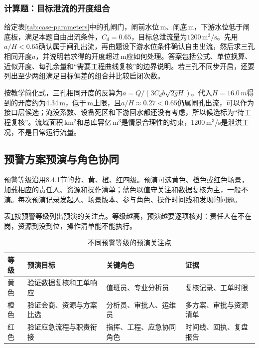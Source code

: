 \subsubsection{计算题：目标泄流的开度组合}
给定表\ref{tab:case-parameters}中的\cpGateCount 孔闸门，闸前水位\cpNormalLevel\,m、闸底\cpGateSillElev\,m，下游水位低于闸底板，满足本题自由出流条件，$C_d=0.65$，目标总泄流量为$1200\,\mathrm{m^3/s}$。先用$a/H<0.65$确认属于闸孔出流，再由题设下游水位条件确认自由出流，然后求三孔相同开度$a$，并说明若求得的开度超过\cpGateMaxOpen\,m应如何处理。答案包括公式、单位换算、近似开度、每孔余量和“需要工程曲线复核”的边界说明。若三孔不同步开启，还要列出至少两组满足目标偏差的组合并比较启闭次数。

按教学简化式，三孔相同开度的反算为$a=Q/(3C_db\sqrt{2gH})$。代入$H=16.0\,m$得到的开度约为4.34\,m，低于\cpGateMaxOpen\,m上限，且$a/H\approx0.27<0.65$仍属闸孔出流，可以作为接口层候选；淹没系数、设备死区和下游回水都还没有考虑，所以候选标为“待工程复核”。流域面积\cpBasinArea\,km$^2$和总库容\cpTotalCapacity 亿\,m$^3$是情景合理性的约束，1200\,m$^3$/s是泄洪工况，不是日常运行流量。

\subsection{预警方案预演与角色协同}

预警等级沿用8.4.1节的蓝、黄、橙、红四级。预演可选黄色、橙色或红色场景，加载相应的责任人、资源和操作清单；蓝色以值守关注和数据复核为主，一般不演。每次预演记录发起人、场景版本、参与角色、操作时间线和发现的问题。

表\ref{tab:warning-rehearsal}按预警等级列出预演的关注点。等级越高，预演越要逐项核对：责任人在不在岗，资源到没到位，操作清单能不能执行。

\begin{table}[htbp]
\centering
\caption{不同预警等级的预演关注点}
\label{tab:warning-rehearsal}
\begin{tabular}{p{1.7cm}p{3.7cm}p{4.2cm}p{3.2cm}}
\toprule
等级 & 预演目标 & 关键角色 & 证据 \\
\midrule
黄色 & 验证数据复核和工单响应 & 值班员、专业分析员 & 复核记录、工单时限 \\
橙色 & 验证会商、资源与方案比选 & 分析员、审批人、运维员 & 多方案、审批与资源清单 \\
红色 & 验证应急流程与职责衔接 & 指挥、工程、应急协同角色 & 时间线、回执、复盘报告 \\
\bottomrule
\end{tabular}
\end{table}

